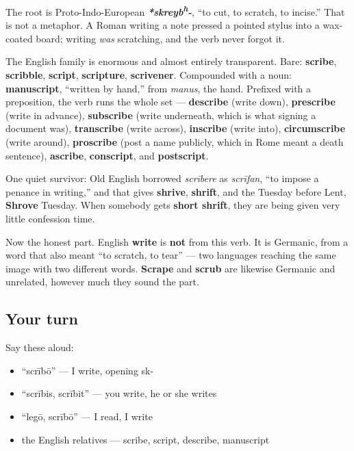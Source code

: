 \begin{cousinweb}
The root is Proto-Indo-European \emph{\textbf{*skreyb\textsuperscript{h}-}}, \textquotedblleft{}to cut, to scratch, to incise.\textquotedblright{} That is not a metaphor. A Roman writing a note pressed a pointed stylus into a wax-coated board; writing \emph{was} scratching, and the verb never forgot it.

The English family is enormous and almost entirely transparent. Bare: \textbf{scribe}, \textbf{scribble}, \textbf{script}, \textbf{scripture}, \textbf{scrivener}. Compounded with a noun: \textbf{manuscript}, \textquotedblleft{}written by hand,\textquotedblright{} from \emph{manus}, the hand. Prefixed with a preposition, the verb runs the whole set — \textbf{describe} (write down), \textbf{prescribe} (write in advance), \textbf{subscribe} (write underneath, which is what signing a document was), \textbf{transcribe} (write across), \textbf{inscribe} (write into), \textbf{circumscribe} (write around), \textbf{proscribe} (post a name publicly, which in Rome meant a death sentence), \textbf{ascribe}, \textbf{conscript}, and \textbf{postscript}.

One quiet survivor: Old English borrowed \emph{scrībere} as \emph{scrīfan}, \textquotedblleft{}to impose a penance in writing,\textquotedblright{} and that gives \textbf{shrive}, \textbf{shrift}, and the Tuesday before Lent, \textbf{Shrove} Tuesday. When somebody gets \textbf{short shrift}, they are being given very little confession time.

Now the honest part. English \textbf{write} is \textbf{not} from this verb. It is Germanic, from a word that also meant \textquotedblleft{}to scratch, to tear\textquotedblright{} — two languages reaching the same image with two different words. \textbf{Scrape} and \textbf{scrub} are likewise Germanic and unrelated, however much they sound the part.
\end{cousinweb}

\subsection*{Your turn}
Say these aloud:

\begin{itemize}
\raggedright
  \item \textquotedblleft{}scrībō\textquotedblright{} — I write, opening sk-
  \item \textquotedblleft{}scrībis, scrībit\textquotedblright{} — you write, he or she writes
  \item \textquotedblleft{}legō, scrībō\textquotedblright{} — I read, I write
  \item the English relatives — scribe, script, describe, manuscript
\end{itemize}

